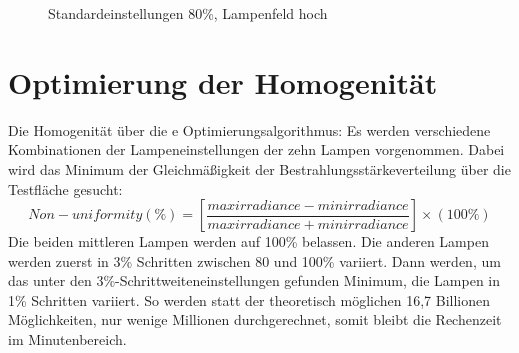 \documentclass[a4paper,bibtotoc,oneside]{scrbook}
\begin{document}
\begin{figure} [htbp]
\caption{Standardeinstellungen 80\%, Lampenfeld hoch}
\label{h80}
\end{figure}

\FloatBarrier

\section{Optimierung der Homogenität}

Die Homogenität über die e Optimierungsalgorithmus: Es werden verschiedene Kombinationen der Lampeneinstellungen der zehn Lampen vorgenommen. Dabei wird das Minimum der Gleichmäßigkeit der Bestrahlungsstärkeverteilung über die Testfläche gesucht:
\begin{equation}
 Non-uniformity (\%) = [\frac{max irradiance - min irradiance}{max irradiance + min irradiance}] \times (100\%)
\end{equation}
Die beiden mittleren Lampen werden auf 100\% belassen. Die anderen Lampen werden zuerst in 3\% Schritten zwischen 80 und 100\% variiert. Dann werden, um das unter den 3\%-Schrittweiteneinstellungen gefunden Minimum, die Lampen in 1\% Schritten variiert. So werden statt der theoretisch möglichen 16,7 Billionen Möglichkeiten, nur wenige Millionen durchgerechnet, somit bleibt die Rechenzeit im Minutenbereich.
\end{document}
